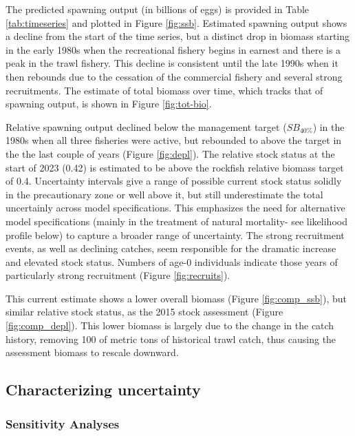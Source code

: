 \documentclass[11pt,
  letterpaper,
]{article}
\begin{document}
The predicted spawning output (in billions of eggs) is provided in Table \ref{tab:timeseries} and plotted in Figure \ref{fig:ssb}. Estimated spawning output shows a decline from the start of the time series, but a distinct drop in biomass starting in the early 1980s when the recreational fishery begins in earnest and there is a peak in the trawl fishery. This decline is consistent until the late 1990s when it then rebounds due to the cessation of the commercial fishery and several strong recruitments. The estimate of total biomass over time, which tracks that of spawning output, is shown in Figure \ref{fig:tot-bio}.

Relative spawning output declined below the management target (\(SB_{40\%}\)) in the 1980s when all three fisheries were active, but rebounded to above the target in the the last couple of years (Figure \ref{fig:depl}). The relative stock status at the start of 2023 (0.42) is estimated to be above the rockfish relative biomass target of 0.4. Uncertainty intervals give a range of possible current stock status solidly in the precautionary zone or well above it, but still underestimate the total uncertainly across model specifications. This emphasizes the need for alternative model specifications (mainly in the treatment of natural mortality- see likelihood profile below) to capture a broader range of uncertainty. The strong recruitment events, as well as declining catches, seem responsible for the dramatic increase and elevated stock status. Numbers of age-0 individuals indicate those years of particularly strong recruitment (Figure \ref{fig:recruits}).

This current estimate shows a lower overall biomass (Figure \ref{fig:comp_ssb}), but similar relative stock status, as the 2015 stock assessment (Figure \ref{fig:comp_depl}). This lower biomass is largely due to the change in the catch history, removing 100 of metric tons of historical trawl catch, thus causing the assessment biomass to rescale downward.

\hypertarget{characterizing-uncertainty}{%
\subsection{Characterizing uncertainty}\label{characterizing-uncertainty}}

\hypertarget{sensitivity-analyses}{%
\subsubsection{Sensitivity Analyses}\label{sensitivity-analyses}}
\end{document}
